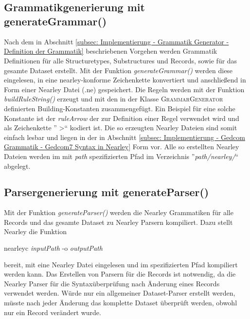 \\ \\

\subsection{Grammatikgenerierung mit generateGrammar()}
\label{subsec: Implementierung - Grammatik Generator - generateGrammar}
Nach dem in Abschnitt \ref{subsec: Implementierung - Grammatik Generator - Definition der Grammatik} beschriebenen Vorgehen werden Grammatik Definitionen für alle Structuretypes, Substructures und Records, sowie für das gesamte Dataset erstellt. Mit der Funktion \textit{generateGrammar()} werden diese eingelesen, in eine nearley-konforme Zeichenkette konvertiert und anschließend in Form einer Nearley Datei (.ne) gespeichert. Die Regeln werden mit der Funktion \textit{buildRuleString()} erzeugt und mit den in der Klasse \textsc{GrammarGenerator} definierten Building-Konstanten zusammengefügt. Ein Beispiel für eine solche Konstante ist der \textit{ruleArrow} der zur Definition einer Regel verwendet wird und als Zeichenkette '' \textendash\textgreater`` kodiert ist. Die so erzeugten Nearley Dateien sind somit einfach lesbar und liegen in der in Abschnitt \ref{subsec: Implementierung - Gedcom Grammatik - Gedcom7 Syntax in Nearley} Form vor. Alle so erstellten Nearley Dateien werden im mit \textit{path} spezifizierten Pfad im Verzeichnis ''\textit{path/nearley/}`` abgelegt.

\subsection{Parsergenerierung mit generateParser()}
\label{subsec: Implementierung - Grammatik Generator - generateParser}
Mit der Funktion \textit{generateParser()} werden die Nearley Grammatiken für alle Records und das gesamte Dataset zu Nearley Parsern kompiliert. Dazu stellt Nearley die Funktion 
\begin{center}
	nearleyc  \textit{inputPath} -o \textit{outputPath}
\end{center}
bereit, mit eine Nearley Datei eingelesen und im spezifizierten Pfad kompiliert werden kann. Das Erstellen von Parsern für die Records ist notwendig, da die Nearley Parser für die Syntaxüberprüfung nach Änderung eines Records verwendet werden. Würde nur ein allgemeiner Dataset-Parser erstellt werden, müsste nach jeder Änderung das komplette Dataset überprüft werden, obwohl nur ein Record verändert wurde. 

